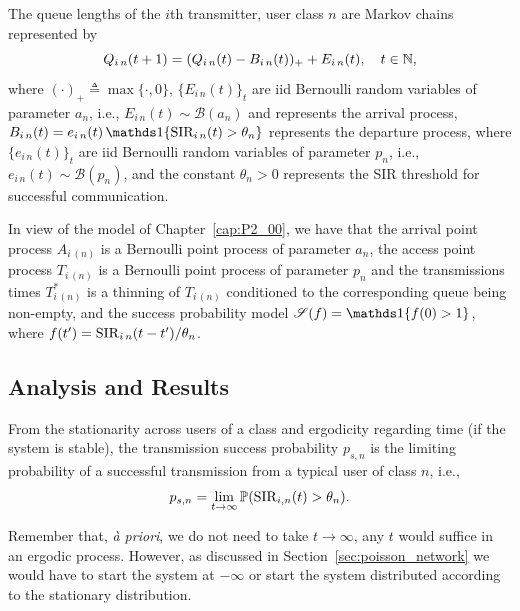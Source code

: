 The queue lengths of the $i$th transmitter, user class $n$ are Markov chains represented by
\begin{equation*}
	Q_{i\,n}(t+1) = (Q_{i\,n}(t) - B_{i\,n}(t))_+ + E_{i\,n}(t), \quad t \in \N,
\end{equation*}
where $(\cdot)_+ \triangleq \max\{\cdot,0\}$, $\{E_{i\,n}(t)\}_t$ are iid Bernoulli random variables of parameter $a_n$, i.e., $E_{i\,n}(t)\sim\mathscr{B}(a_n)$ and represents the arrival process,
$
	B_{i\,n}(t) = e_{i\,n}(t)\,\ind\{\text{SIR}_{i\,n}(t)>\theta_{n}\}
$
represents the departure process, where $\{e_{i\,n}(t)\}_t$ are iid Bernoulli random variables of parameter $p_n$, i.e., $e_{i\,n}(t)\sim\mathscr{B}(p_n)$, and the constant $\theta_n > 0$ represents the SIR threshold for successful communication.

\begin{remark}
        In view of the model of Chapter~\ref{cap:P2_00}, we have that the arrival point process $A_{i\,(n)}$ is a Bernoulli point process of parameter $a_n$, the access point process $T_{i\,(n)}$ is a Bernoulli point process of parameter $p_n$ and the transmissions times $T_{i\,(n)}^*$ is a thinning of $T_{i\,(n)}$ conditioned to the corresponding queue being non-empty, and the success probability model $\mathscr{S}(f) = \ind\{f(0) > 1\}$, where $f(t') = \SIR_{i\,n}(t-t')/\theta_n$.
\end{remark}

\subsection{Analysis and Results}
\label{ssec:N-users}

From the stationarity across users of a class and ergodicity regarding time (if the system is stable), the transmission success probability $p_{s,n}$ is the limiting probability of a successful transmission from a typical user of class $n$, i.e., $$p_{s,n} = \lim_{t\to\infty} \P(\mathrm{SIR}_{i,n}(t) > \theta_n).$$

\begin{note}
    Remember that, \textit{à priori}, we do not need to take $t\to\infty$, any $t$ would suffice in an ergodic process.
    However, as discussed in Section~\ref{sec:poisson_network} we would have to start the system at $-\infty$ or start the system distributed according to the stationary distribution.
\end{note}

